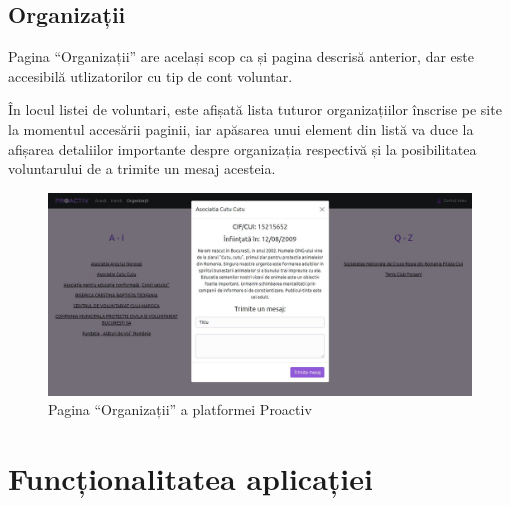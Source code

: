 \documentclass[12pt,a4paper]{report}
\begin{document}
\section{Organizații}
\par
Pagina “Organizații” are același scop ca și pagina descrisă anterior, dar este accesibilă utlizatorilor cu tip de cont voluntar.
\\\par
În locul listei de voluntari, este afișată lista tuturor organizațiilor înscrise pe site la momentul accesării paginii, iar apăsarea unui element din listă va duce la afișarea detaliilor importante despre organizația respectivă și la posibilitatea voluntarului de a trimite un mesaj acesteia.
\\
\begin{figure}[H]
\centering
  \includegraphics[width=1\linewidth]{./imagini/org.jpg}
  \caption{Pagina “Organizații” a platformei Proactiv}
\end{figure}

\chapter{Funcționalitatea aplicației}
\end{document}
